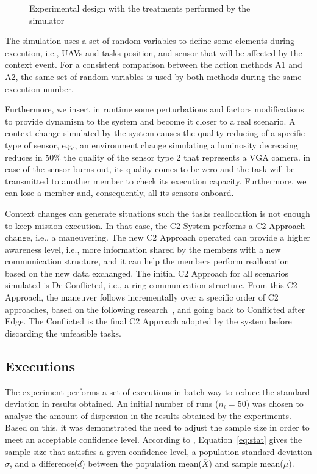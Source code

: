 \begin{figure}[ht!]
    \centering
    \scalebox{.65}{}
    \caption{Experimental design with the treatments performed by the simulator}
    \label{fig:exp_design}
\end{figure}

The simulation uses a set of random variables to define some elements during execution, i.e., UAVs and tasks position, and sensor that will be affected by the context event. For a consistent comparison between the action methods A1 and A2, the same set of random variables is used by both methods during the same execution number. 

Furthermore, we insert in runtime some perturbations and factors modifications to provide dynamism to the system and become it closer to a real scenario. A context change simulated by the system causes the quality reducing of a specific type of sensor, e.g., an environment change simulating a luminosity decreasing reduces in $50\%$ the quality of the sensor type 2 that represents a VGA camera. in case of the sensor burns out, its quality comes to be zero and the task will be transmitted to another member to check its execution capacity. Furthermore, we can lose a member and, consequently, all its sensors onboard.

Context changes can generate situations such the tasks reallocation is not enough to keep mission execution. In that case, the C2 System performs a C2 Approach change, i.e., a maneuvering. The new C2 Approach operated can provide a higher awareness level, i.e., more information shared by the members with a new communication structure, and it can help the members perform reallocation based on the new data exchanged. The initial C2 Approach for all scenarios simulated is De-Conflicted, i.e., a ring communication structure. From this C2 Approach, the maneuver follows incrementally over a specific order of C2 approaches, based on the following research~\cite{france2014}, and going back to Conflicted after Edge. The Conflicted is the final C2 Approach adopted by the system before discarding the unfeasible tasks.


\subsection{Executions}
\label{subsec:operations}

The experiment performs a set of executions in batch way to reduce the standard deviation in results obtained. An initial number of runs ($n_i=50$) was chosen to analyse the amount of dispersion in the results obtained by the experiments. Based on this, it was demonstrated the need to adjust the sample size in order to meet an acceptable confidence level. According to \cite{CochranW.G.1983}, Equation~\ref{eq:stat} gives the sample size that satisfies a given confidence level, a population standard deviation $\sigma$, and a difference($d$) between the population mean($\overline{X}$) and sample mean($\mu$).

